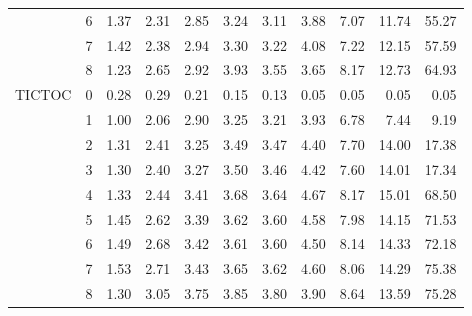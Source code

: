 \begin{tabular}{llrrrrrrrrr}
       & 6 &  1.37 &  2.31 &  2.85 &  3.24 &  3.11 &  3.88 &  7.07 & 11.74 & 55.27 \\
       & 7 &  1.42 &  2.38 &  2.94 &  3.30 &  3.22 &  4.08 &  7.22 & 12.15 & 57.59 \\
       & 8 &  1.23 &  2.65 &  2.92 &  3.93 &  3.55 &  3.65 &  8.17 & 12.73 & 64.93 \\
TICTOC & 0 &  0.28 &  0.29 &  0.21 &  0.15 &  0.13 &  0.05 &  0.05 &  0.05 &  0.05 \\
       & 1 &  1.00 &  2.06 &  2.90 &  3.25 &  3.21 &  3.93 &  6.78 &  7.44 &  9.19 \\
       & 2 &  1.31 &  2.41 &  3.25 &  3.49 &  3.47 &  4.40 &  7.70 & 14.00 & 17.38 \\
       & 3 &  1.30 &  2.40 &  3.27 &  3.50 &  3.46 &  4.42 &  7.60 & 14.01 & 17.34 \\
       & 4 &  1.33 &  2.44 &  3.41 &  3.68 &  3.64 &  4.67 &  8.17 & 15.01 & 68.50 \\
       & 5 &  1.45 &  2.62 &  3.39 &  3.62 &  3.60 &  4.58 &  7.98 & 14.15 & 71.53 \\
       & 6 &  1.49 &  2.68 &  3.42 &  3.61 &  3.60 &  4.50 &  8.14 & 14.33 & 72.18 \\
       & 7 &  1.53 &  2.71 &  3.43 &  3.65 &  3.62 &  4.60 &  8.06 & 14.29 & 75.38 \\
       & 8 &  1.30 &  3.05 &  3.75 &  3.85 &  3.80 &  3.90 &  8.64 & 13.59 & 75.28 \\
\bottomrule
\end{tabular}
